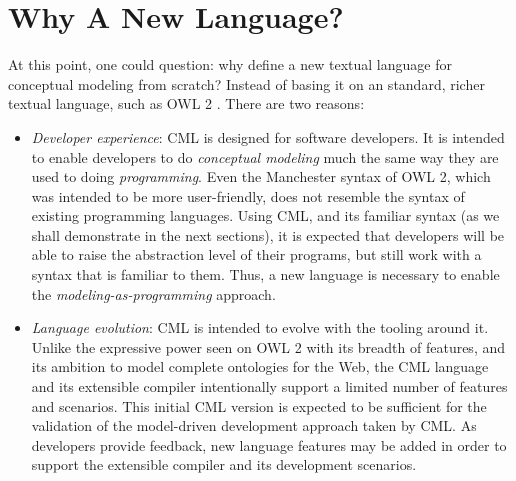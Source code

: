 \section{Why A New Language?}\label{sec:why}

At this point, one could question: why define a new textual language for conceptual modeling from scratch? Instead of basing it on an standard, richer textual language, such as OWL 2 \cite{owl2}. There are two reasons:
\begin{itemize}
\item\emph{Developer experience}: CML is designed for software developers.
It is intended to enable developers to do \emph{conceptual modeling} much the same way they are used to doing \emph{programming}.
Even the Manchester \cite{owl2manchester} syntax of OWL 2, which was intended to be more user-friendly, does not resemble the syntax of existing programming languages.
Using CML, and its familiar syntax (as we shall demonstrate in the next sections), it is expected that developers will be able to raise the abstraction level of their programs, but still work with a syntax that is familiar to them.
Thus, a new language is necessary to enable the \emph{modeling-as-programming} approach. 
\item\emph{Language evolution}: CML is intended to evolve with the tooling around it.
Unlike the expressive power seen on OWL 2 \cite{owl2} with its breadth of features,
and its ambition to model complete ontologies for the Web,
the CML language and its extensible compiler intentionally support a limited number of features and scenarios.
This initial CML version is expected to be sufficient for the validation of the model-driven development approach taken by CML.
As developers provide feedback, new language features may be added in order to support the extensible compiler and its development scenarios.
\end{itemize}
